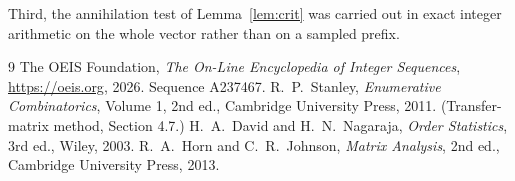 \documentclass[11pt,a4paper]{article}
\theoremstyle{plain}
\theoremstyle{definition}
\begin{document}
Third, the annihilation test of Lemma~\ref{lem:crit} was carried out in exact integer
arithmetic on the whole vector rather than on a sampled prefix.

\begin{thebibliography}{9}
 The OEIS Foundation, \emph{The On-Line Encyclopedia of Integer
Sequences}, \url{https://oeis.org}, 2026. Sequence A237467.
 R.~P.~Stanley, \emph{Enumerative Combinatorics}, Volume 1, 2nd ed.,
Cambridge University Press, 2011. (Transfer-matrix method, Section 4.7.)
 H.~A.~David and H.~N.~Nagaraja, \emph{Order Statistics}, 3rd ed., Wiley,
2003.
 R.~A.~Horn and C.~R.~Johnson, \emph{Matrix Analysis}, 2nd ed., Cambridge
University Press, 2013.
\end{thebibliography}
\end{document}
